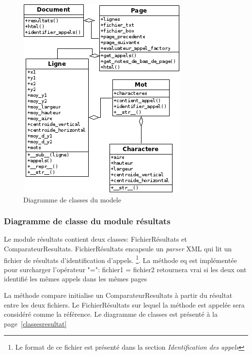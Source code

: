 \begin{figure}
    \centerline{\includegraphics{figures/diagramme-classe-modele.png}}
    \caption{Diagramme de classes du modele}
    \label{classesmodele}
\end{figure}

\subsubsection{Diagramme de classe du module résultats}
Le module résultats contient deux classes: FichierRésultats et ComparateurResultats. FichierRésultats encapsule un \emph{parser} XML qui lit un fichier de résultats d'identification d'appels. \footnote{Le format de ce fichier est présenté dans la section \emph{Identification des appels}}. La méthode eq est implémentée pour surcharger l'opérateur "=": fichier1 = fichier2 retournera vrai si les deux ont identifié les mêmes appels dans les mêmes pages

La méthode compare initialise un ComparateurResultats à partir du résultat entre les deux fichiers. Le FichierRésultats sur lequel la méthode est appelée sera considéré comme la référence. Le diagramme de classes est présenté à la page~\ref{classesresultat}

